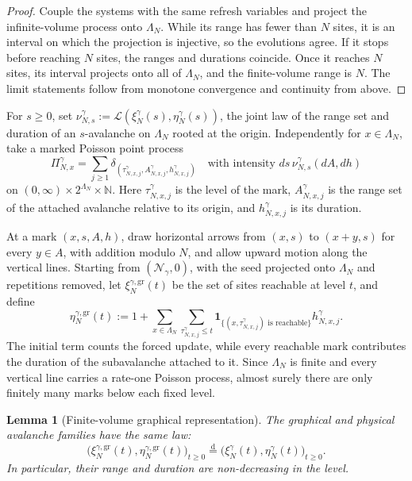 \documentclass[11pt,a4paper]{amsart}
\newtheorem{lemma}[theorem]{Lemma}
\theoremstyle{remark}
\newcommand{\N}{\mathbb N}
\begin{document}
\begin{proof}
Couple the systems with the same refresh variables and project the
infinite-volume process onto $\Lambda_N$. While its range has fewer than
$N$ sites, it is an interval on which the projection is injective, so the
evolutions agree. If it stops before reaching $N$ sites, the ranges and
durations coincide. Once it reaches $N$ sites, its interval projects onto
all of $\Lambda_N$, and the finite-volume range is $N$. The limit
statements follow from monotone convergence and continuity from above.
\end{proof}



For $s\geq0$, set
$\nu_{N,s}^\gamma
:=\mathcal L(\xi_N^\gamma(s),\eta_N^\gamma(s))$, the joint law of the
range set and duration of an $s$-avalanche on $\Lambda_N$ rooted at the
origin. Independently for $x\in\Lambda_N$, take a marked Poisson point
process
\[
        \Pi_{N,x}^\gamma
        =
        \sum_{j\geq1}
        \delta_{(\tau_{N,x,j}^\gamma,
        A_{N,x,j}^\gamma,h_{N,x,j}^\gamma)}
        \quad\text{with intensity }
        ds\,\nu_{N,s}^\gamma(dA,dh)
\]
on $(0,\infty)\times2^{\Lambda_N}\times\N$. Here
$\tau_{N,x,j}^\gamma$ is the level of the mark,
$A_{N,x,j}^\gamma$ is the range set of the attached avalanche relative
to its origin, and $h_{N,x,j}^\gamma$ is its duration. 


At a mark $(x,s,A,h)$, draw horizontal arrows from $(x,s)$ to
$(x+y,s)$ for every $y\in A$, with addition modulo $N$, and allow
upward motion along the vertical lines. Starting from
$(\mathcal N_\gamma,0)$, with the seed projected onto $\Lambda_N$ and
repetitions removed, let $\xi_N^{\gamma,\mathrm{gr}}(t)$ be the set of
sites reachable at level $t$, and define
\[
        \eta_N^{\gamma,\mathrm{gr}}(t)
        :=
        1+
        \sum_{x\in\Lambda_N}
        \sum_{\tau_{N,x,j}^\gamma\leq t}
        \mathbf 1_{\{
        (x,\tau_{N,x,j}^\gamma)\text{ is reachable}\}}
        h_{N,x,j}^\gamma.
\]
The initial term counts the forced update, while every reachable mark
contributes the duration of the subavalanche attached to it. Since
$\Lambda_N$ is finite and every vertical line carries a rate-one
Poisson process, almost surely there are only finitely many marks below
each fixed level.

\begin{lemma}[Finite-volume graphical representation]
\label{lem:app-graphical}
The graphical and physical avalanche families have the same law:
\[
        \bigl(
        \xi_N^{\gamma,\mathrm{gr}}(t),
        \eta_N^{\gamma,\mathrm{gr}}(t)
        \bigr)_{t\geq0}
        \stackrel{\mathrm d}=
        \bigl(
        \xi_N^\gamma(t),
        \eta_N^\gamma(t)
        \bigr)_{t\geq0}.
\]
In particular, their range and duration are non-decreasing in the
level.
\end{lemma}
\end{document}
